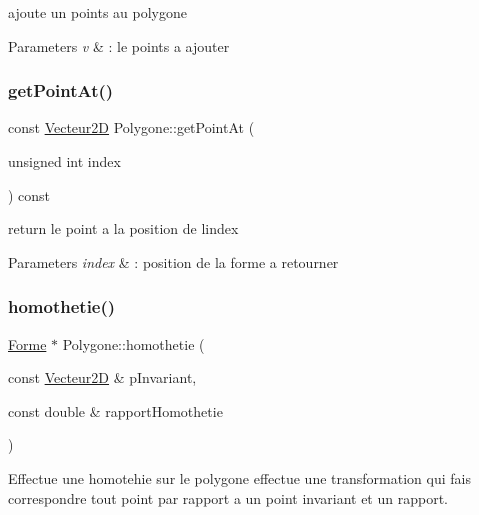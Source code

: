 ajoute un points au polygone 


\begin{DoxyParams}{Parameters}
{\em v} & \+: le points a ajouter \\
\hline
\end{DoxyParams}
\mbox{\label{class_polygone_a42ae9f828760d86f55c451f962c3d971}} 
\subsubsection{\texorpdfstring{getPointAt()}{getPointAt()}}
{\footnotesize\ttfamily const \mbox{\hyperlink{class_vecteur2_d}{Vecteur2D}} Polygone\+::get\+Point\+At (\begin{DoxyParamCaption}\item[{unsigned int}]{index }\end{DoxyParamCaption}) const}



return le point a la position de l\textquotesingle{}index 


\begin{DoxyParams}{Parameters}
{\em index} & \+: position de la forme a retourner \\
\hline
\end{DoxyParams}
\mbox{\label{class_polygone_a2b3a44918d723d9fc8bf053b7d8410cb}} 
\subsubsection{\texorpdfstring{homothetie()}{homothetie()}}
{\footnotesize\ttfamily \mbox{\hyperlink{class_forme}{Forme}} $\ast$ Polygone\+::homothetie (\begin{DoxyParamCaption}\item[{const \mbox{\hyperlink{class_vecteur2_d}{Vecteur2D}} \&}]{p\+Invariant,  }\item[{const double \&}]{rapport\+Homothetie }\end{DoxyParamCaption})\hspace{0.3cm}{\ttfamily [virtual]}}



Effectue une homotehie sur le polygone effectue une transformation qui fais correspondre tout point par rapport a un point invariant et un rapport. 


